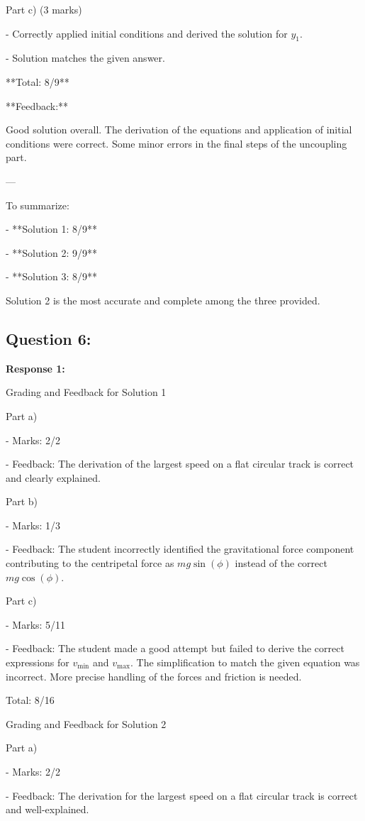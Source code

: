 \documentclass[a4paper,11pt]{article}
\begin{document}
Part c) (3 marks)

- Correctly applied initial conditions and derived the solution for \( y_1 \).

- Solution matches the given answer.

**Total: 8/9**

**Feedback:**

Good solution overall. The derivation of the equations and application of initial conditions were correct. Some minor errors in the final steps of the uncoupling part.

---

To summarize:

- **Solution 1: 8/9**

- **Solution 2: 9/9**

- **Solution 3: 8/9**

Solution 2 is the most accurate and complete among the three provided.


\subsection*{Question 6:}

\textbf{Response 1:}

Grading and Feedback for Solution 1

Part a)

- Marks: 2/2

- Feedback: The derivation of the largest speed on a flat circular track is correct and clearly explained.

Part b)

- Marks: 1/3

- Feedback: The student incorrectly identified the gravitational force component contributing to the centripetal force as \( mg\sin(\phi) \) instead of the correct \( mg\cos(\phi) \). 

Part c)

- Marks: 5/11

- Feedback: The student made a good attempt but failed to derive the correct expressions for \( v_{\text{min}} \) and \( v_{\text{max}} \). The simplification to match the given equation was incorrect. More precise handling of the forces and friction is needed.

Total: 8/16

Grading and Feedback for Solution 2

Part a)

- Marks: 2/2

- Feedback: The derivation for the largest speed on a flat circular track is correct and well-explained.
\end{document}
